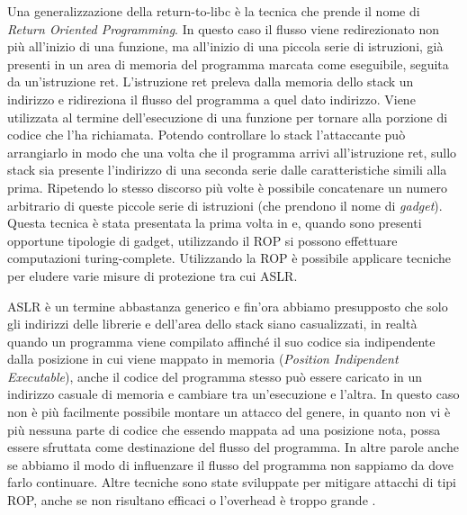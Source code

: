Una generalizzazione della return-to-libc è la tecnica che prende il
nome di \emph{Return Oriented
  Programming}\cite{Shacham-2007,Roemer-2012}. In questo caso il
flusso viene redirezionato non più all'inizio di una funzione, ma
all'inizio di una piccola serie di istruzioni, già presenti in un area
di memoria del programma marcata come eseguibile, seguita da
un'istruzione ret. L'istruzione ret preleva dalla memoria dello stack
un indirizzo e ridireziona il flusso del programma a quel dato
indirizzo. Viene utilizzata al termine dell'esecuzione di una funzione
per tornare alla porzione di codice che l'ha richiamata. Potendo
controllare lo stack l'attaccante può arrangiarlo in modo che una
volta che il programma arrivi all'istruzione ret, sullo stack sia
presente l'indirizzo di una seconda serie dalle caratteristiche simili
alla prima. Ripetendo lo stesso discorso più volte è possibile
concatenare un numero arbitrario di queste piccole serie di istruzioni
(che prendono il nome di \emph{gadget}). Questa tecnica è stata
presentata la prima volta in \cite{Shacham-2007} e, quando sono
presenti opportune tipologie di gadget, utilizzando il ROP si possono
effettuare computazioni turing-complete. Utilizzando la ROP è
possibile applicare tecniche per eludere varie misure di protezione
\cite{roglia:2009} tra cui ASLR.

ASLR è un termine abbastanza generico e fin'ora abbiamo presupposto
che solo gli indirizzi delle librerie e dell'area dello stack siano
casualizzati, in realtà quando un programma viene compilato affinché
il suo codice sia indipendente dalla posizione in cui viene mappato in
memoria (\emph{Position Indipendent Executable}), anche il codice del
programma stesso può essere caricato in un indirizzo casuale di
memoria e cambiare tra un'esecuzione e l'altra. In questo caso non è
più facilmente possibile montare un attacco del genere, in quanto non
vi è più nessuna parte di codice che essendo mappata ad una posizione
nota, possa essere sfruttata come destinazione del flusso del
programma. In altre parole anche se abbiamo il modo di influenzare il
flusso del programma non sappiamo da dove farlo continuare. Altre
tecniche sono state sviluppate per mitigare attacchi di tipi ROP,
anche se non risultano efficaci o l'overhead è troppo grande
\cite{Davi-2014}.


